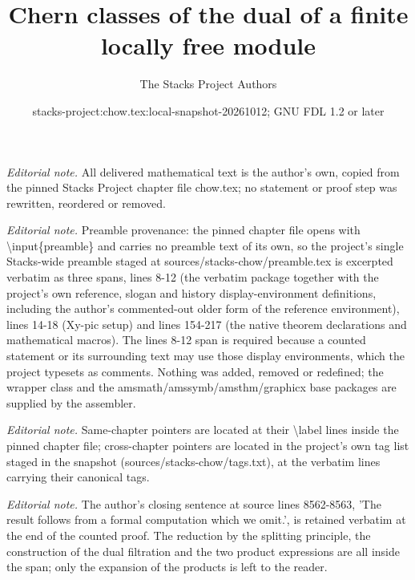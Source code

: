 \documentclass[10pt,a4paper]{amsart}
\title{Chern classes of the dual of a finite locally free module}
\author{The Stacks Project Authors}
\date{stacks-project:chow.tex:local-snapshot-20261012; GNU FDL 1.2 or later}
\theoremstyle{plain}
\theoremstyle{definition}
\theoremstyle{remark}
\numberwithin{equation}{subsection}
\begin{document}
\maketitle
\noindent\textit{Editorial note.} All delivered mathematical text is the author's own, copied from the pinned Stacks Project chapter file chow.tex; no statement or proof step was rewritten, reordered or removed.\par\medskip
\noindent\textit{Editorial note.} Preamble provenance: the pinned chapter file opens with \textbackslash{}input\{preamble\} and carries no preamble text of its own, so the project's single Stacks-wide preamble staged at sources/stacks-chow/preamble.tex is excerpted verbatim as three spans, lines 8-12 (the verbatim package together with the project's own reference, slogan and history display-environment definitions, including the author's commented-out older form of the reference environment), lines 14-18 (Xy-pic setup) and lines 154-217 (the native theorem declarations and mathematical macros). The lines 8-12 span is required because a counted statement or its surrounding text may use those display environments, which the project typesets as comments. Nothing was added, removed or redefined; the wrapper class and the amsmath/amssymb/amsthm/graphicx base packages are supplied by the assembler.\par\medskip
\noindent\textit{Editorial note.} Same-chapter pointers are located at their \textbackslash{}label lines inside the pinned chapter file; cross-chapter pointers are located in the project's own tag list staged in the snapshot (sources/stacks-chow/tags.txt), at the verbatim lines carrying their canonical tags.\par\medskip
\noindent\textit{Editorial note.} The author's closing sentence at source lines 8562-8563, 'The result follows from a formal computation which we omit.', is retained verbatim at the end of the counted proof. The reduction by the splitting principle, the construction of the dual filtration and the two product expressions are all inside the span; only the expansion of the products is left to the reader.\par\medskip
\end{document}

